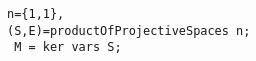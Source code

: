 \documentclass[twoside,12pt, leqno]{amsart}
\begin{document}
{\small 
\begin{verbatim}
n={1,1}, 
(S,E)=productOfProjectiveSpaces n;
 M = ker vars S;
\end{verbatim}
%

}
\end{document}
